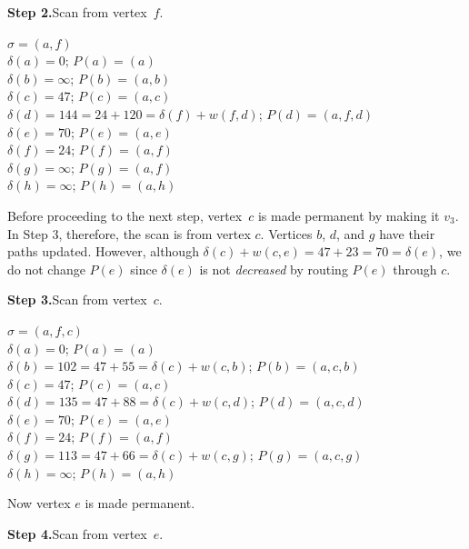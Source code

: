\medskip
\textbf{Step 2.}\quad Scan from vertex~$f$.

\begingroup
{}
\rightskip\leftskip

\medskip
$\sigma=(a,f)$\\
$\delta(a)=0$; $P(a)=(a)$\\
$\delta(b)=\infty$; $P(b)=(a,b)$\\
$\delta(c)=47$; $P(c)=(a,c)$\\
$\delta(d)=144 = 24 + 120 = \delta(f)+w(f,d)$; $P(d)=(a,f,d)$\quad{}\\
$\delta(e)=70$; $P(e)=(a,e)$\\
$\delta(f)=24$; $P(f)=(a,f)$\\
$\delta(g)=\infty$; $P(g)=(a,f)$\\
$\delta(h)=\infty$; $P(h)=(a,h)$\\

\endgroup

Before proceeding to the next step, vertex~$c$ is made permanent by
making it $v_3$. In Step 3, therefore, the scan is from vertex
$c$. Vertices $b$, $d$, and $g$ have their paths updated. However,
although $\delta(c) + w(c,e) = 47+23=70=\delta(e)$, we do not
change $P(e)$ since $\delta(e)$ is not \emph{decreased} by routing
$P(e)$ through $c$.

\medskip
\textbf{Step 3.}\quad Scan from vertex~$c$.

\begingroup
{}
\rightskip\leftskip

\medskip
$\sigma=(a,f,c)$\\
$\delta(a)=0$; $P(a)=(a)$\\
$\delta(b)=102=47+55= \delta(c)+w(c,b)$; $P(b)=(a,c,b)$\quad{}\\
$\delta(c)=47$; $P(c)=(a,c)$\\
$\delta(d)=135=47+88 = \delta(c)+w(c,d)$; $P(d)=(a,c,d)$\quad{}\\
$\delta(e)=70$; $P(e)=(a,e)$\\
$\delta(f)=24$; $P(f)=(a,f)$\\
$\delta(g)=113=47+66= \delta(c)+w(c,g)$; $P(g)=(a,c,g)$\quad{}\\
$\delta(h)=\infty$; $P(h)=(a,h)$\\

\endgroup

Now vertex $e$ is made permanent.

\medskip
\textbf{Step 4.}\quad Scan from vertex~$e$.

\begingroup
{}
\rightskip\leftskip

